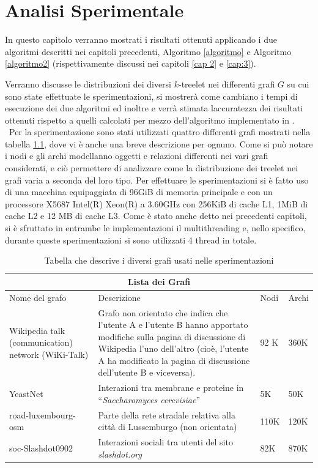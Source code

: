 \chapter{Analisi Sperimentale}
In questo capitolo verranno mostrati i risultati ottenuti applicando i due algoritmi descritti nei capitoli precedenti, Algoritmo \ref{algoritmo} e Algoritmo \ref{algoritmo2} (rispettivamente discussi nei capitoli \ref{cap 2} e \ref{cap:3}).

Verranno discusse le distribuzioni dei diversi $ k $-treelet nei differenti grafi $ G $ su cui sono state effettuate le sperimentazioni, si mostrerà come cambiano i tempi di esecuzione dei due algoritmi ed inoltre e verrà stimata laccuratezza dei risultati ottenuti rispetto a quelli calcolati per mezzo dell'algoritmo implementato in \cite{bressan2019motivo}.\\\
Per la sperimentazione sono stati utilizzati quattro differenti grafi mostrati nella tabella \ref{Tabella:grafo}, dove vi è anche una breve descrizione per ognuno.
Come si può notare i nodi e gli archi modellanno oggetti e relazioni differenti nei vari grafi  considerati, e ciò permettere di analizzare come la distribuzione dei treelet nei grafi varia a seconda del loro tipo.
Per effettuare le sperimentazioni si è fatto uso di una macchina equipaggiata di 96GiB di memoria principale e con un processore X5687 Intel(R) Xeon(R) a 3.60GHz con 256KiB di cache L1, 1MiB di cache L2
e 12 MB di cache L3.
Come è stato anche detto nei precedenti capitoli, si è sfruttato in entrambe le implementazioni il multithreading e, nello specifico, durante queste sperimentazioni si sono utilizzati 4 thread in totale.

\begin{table}
	\small
	\begin{tabular}{|p{4.4cm}|p{6cm}|p{1cm}|p{1cm}| }
		 \hline
		\multicolumn{4}{|c|}{Lista dei Grafi} \\
		\hline
		Nome del grafo & Descrizione & Nodi & Archi\\
		\hline
		\hline
		Wikipedia talk (communication) network (WiKi-Talk) \cite{leskovec2010predicting} & Grafo non orientato che indica che l'utente A e l'utente B hanno apportato modifiche sulla pagina di discussione di Wikipedia l'uno dell'altro (cioè, l'utente A ha modificato la pagina di discussione dell'utente B e viceversa). & 92 K & 360K\\
		\hline
	YeastNet \cite{babu2012interaction} & Interazioni tra membrane e proteine in ``\emph{Saccharomyces  cerevisiae}'' & 5K & 50K\\
		\hline
		 road-luxembourg-osm \cite{bader2013graph} & Parte della rete stradale relativa alla città di Lussemburgo (non orientata) & 110K & 120K\\
		 \hline
		 soc-Slashdot0902 \cite{leskovec2009community} &  Interazioni sociali tra utenti del sito \emph{slashdot.org}& 82K & 870K \\ 
		 \hline
	\end{tabular}
\caption{Tabella che descrive i diversi grafi usati nelle sperimentazioni}
\label{Tabella:grafo}
\end{table}

